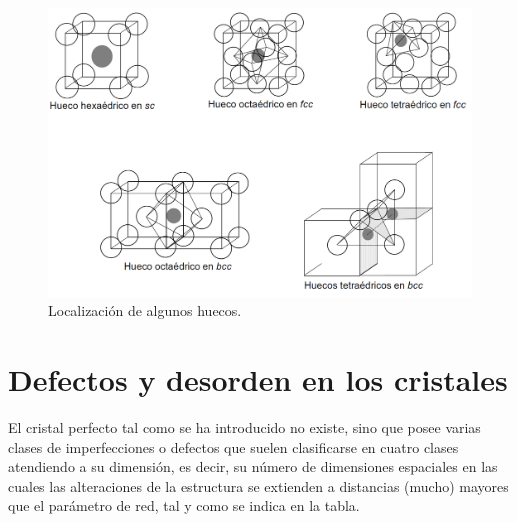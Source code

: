 \begin{figure}[h!] \centering
    \includegraphics[scale=0.4]{Cuerpo/Ch_01/huecos.png}
    \caption{Localización de algunos huecos.}
    \label{Fig:01-05}
\end{figure}


\section{Defectos y desorden en los cristales}

El cristal perfecto tal como se ha introducido no existe, sino que posee varias clases de imperfecciones o defectos que suelen clasificarse en cuatro clases atendiendo a su dimensión, es decir, su número de dimensiones espaciales en las cuales las alteraciones de la estructura se extienden a distancias (mucho) mayores que el parámetro de red, tal y como se indica en la tabla.


